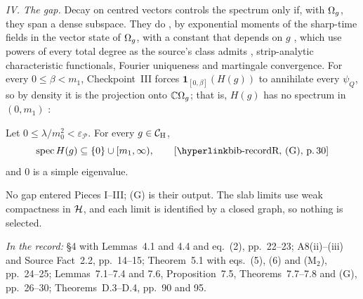 \emph{IV. The gap.} Decay on centred vectors controls the spectrum only if, with
$\Omega_g$, they span a dense subspace. They do , by exponential
moments of the sharp-time fields in the vector state of $\Omega_g$, with a constant that
depends on $g$ , which use powers of every total degree as the
source's class admits , strip-analytic characteristic functionals,
Fourier uniqueness and martingale convergence. For every $0\le\beta<m_1$,
Checkpoint~III forces $\mathbf 1_{[0,\beta]}(H(g))$ to annihilate every $\psi_Q$, so by
density it is the projection onto $\mathbb{C}\Omega_g$; that is, $H(g)$ has no spectrum in
$(0,m_1)$ :

\begin{checkpoint}
Let $0\le\lambda/m_0^2<\varepsilon_{\mathscr P}$. For every $g\in\mathcal{C}_{\mathrm H}$,
\begin{equation*}
 \spec H(g)\subseteq\{0\}\cup[m_1,\infty),
 \tag*{\rec{(G)}{30}}
\end{equation*}
and $0$ is a simple eigenvalue.
\end{checkpoint}

No gap entered Pieces I--III; (G) is their output. The slab limits use weak compactness in
$\mathcal{H}$, and each limit is identified by a closed graph, so nothing is selected.

\noindent\emph{In the record:} \S4 with Lemmas~4.1 and 4.4 and eq.~(2), pp.~22--23;
A8(ii)--(iii) and Source Fact~2.2, pp.~14--15; Theorem~5.1 with eqs.~(5), (6) and
(M$_2$), pp.~24--25; Lemmas~7.1--7.4 and 7.6, Proposition~7.5, Theorems~7.7--7.8 and (G),
pp.~26--30; Theorems~D.3--D.4, pp.~90 and 95.
